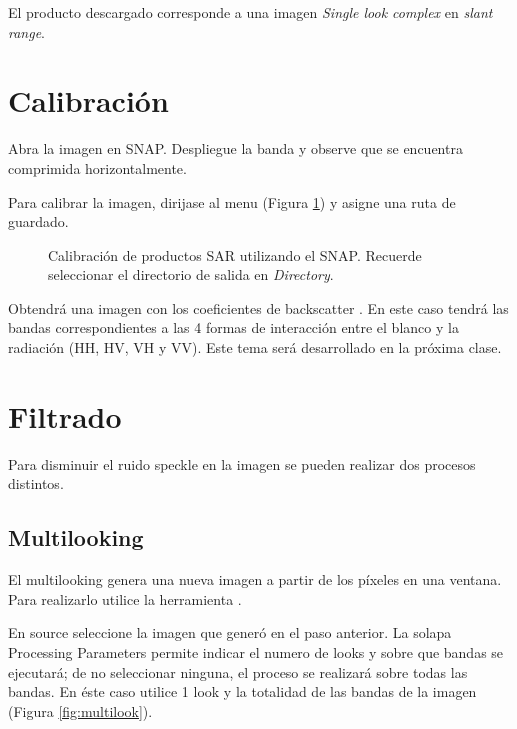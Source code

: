 El producto descargado corresponde a una imagen \emph{Single look complex} en \emph{slant range}.

\section{Calibración}

Abra la imagen  en SNAP. Despliegue la banda  y observe que se encuentra comprimida horizontalmente.

Para calibrar la imagen, dirijase al menu  (Figura \ref{fig:calibrar}) y asigne una ruta de guardado.

 \begin{figure}[h!]
     \centering
     \hfill
     \caption{Calibración de productos SAR utilizando el SNAP. Recuerde seleccionar el directorio de salida en \emph{Directory}.} %
     \label{fig:calibrar}
 \end{figure}

 Obtendrá una imagen con los coeficientes de backscatter . En este caso tendrá las bandas correspondientes a las 4 formas de interacción entre el blanco y la radiación (HH, HV, VH y VV). Este tema será desarrollado en la próxima clase.

 \section{Filtrado}

 Para disminuir el ruido speckle en la imagen se pueden realizar dos procesos distintos.

 \subsection{Multilooking}

 El multilooking genera una nueva imagen a partir de los píxeles en una ventana. Para realizarlo utilice la herramienta .

 En source seleccione la imagen  que generó en el paso anterior. La solapa Processing Parameters permite indicar el numero de looks y sobre que bandas se ejecutará; de no seleccionar ninguna, el proceso se realizará sobre todas las bandas. En éste caso utilice 1 look y la totalidad de las bandas de la imagen (Figura \ref{fig:multilook}).

